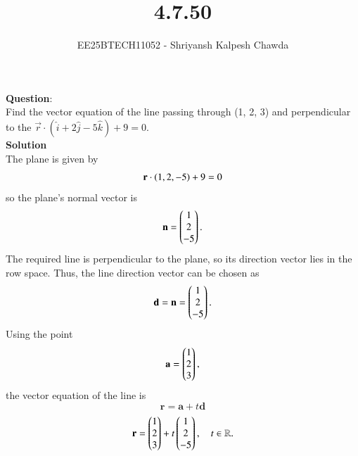 \documentclass[journal]{IEEEtran}
\numberwithin{equation}{enumi}
\numberwithin{figure}{enumi}
\begin{document}
	
	
	\vspace{3cm}
	
	\title{4.7.50}
	\author{EE25BTECH11052 - Shriyansh Kalpesh Chawda}
	\maketitle
	\textbf{Question}:\\
	Find the vector equation of the line passing through (1, 2, 3) and perpendicular to the $\vec{r}\cdot(\hat{i} + 2\hat{j} - 5\hat{k}) + 9 = 0$.
	\\
	\textbf{Solution}\\
The plane is given by
		\begin{equation}
			\mathbf r \cdot \left(1, 2, -5\right) + 9 = 0
		\end{equation}
		so the plane's normal vector is
		\begin{equation}
			\mathbf n = \begin{pmatrix}1 \\ 2 \\ -5\end{pmatrix}.
		\end{equation}
		The required line is perpendicular to the plane, so its direction vector lies in the row space. Thus, the line direction vector can be chosen as
		\begin{equation}
			\mathbf d = \mathbf n = \begin{pmatrix}1 \\ 2 \\ -5\end{pmatrix}.
		\end{equation}
Using the point
		\begin{equation}
			\mathbf a = \begin{pmatrix}1 \\ 2 \\ 3\end{pmatrix},
		\end{equation}
		the vector equation of the line is
		\begin{equation}
			\mathbf r = \mathbf a + t\mathbf d
		\end{equation}
		\begin{equation}
			\mathbf r = \begin{pmatrix}1 \\ 2 \\ 3\end{pmatrix} + t \begin{pmatrix}1 \\ 2 \\ -5\end{pmatrix}, \quad t \in \mathbb R.
		\end{equation}
\end{document}
